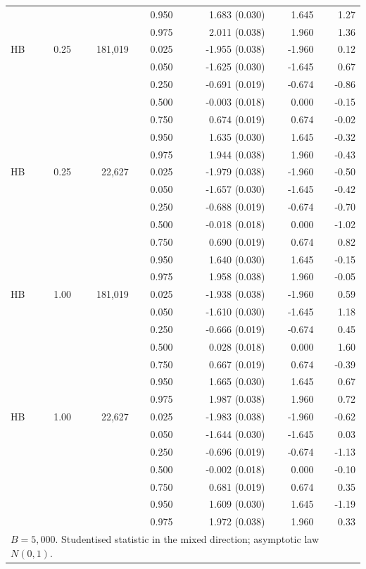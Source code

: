\begin{tabular}{lrrrrrr}
 &  &  & 0.950 & 1.683 (0.030) & 1.645 & 1.27 \\
 &  &  & 0.975 & 2.011 (0.038) & 1.960 & 1.36 \\
\addlinespace
HB & 0.25 & 181,019 & 0.025 & -1.955 (0.038) & -1.960 & 0.12 \\
 &  &  & 0.050 & -1.625 (0.030) & -1.645 & 0.67 \\
 &  &  & 0.250 & -0.691 (0.019) & -0.674 & -0.86 \\
 &  &  & 0.500 & -0.003 (0.018) & 0.000 & -0.15 \\
 &  &  & 0.750 & 0.674 (0.019) & 0.674 & -0.02 \\
 &  &  & 0.950 & 1.635 (0.030) & 1.645 & -0.32 \\
 &  &  & 0.975 & 1.944 (0.038) & 1.960 & -0.43 \\
\addlinespace
HB & 0.25 & 22,627 & 0.025 & -1.979 (0.038) & -1.960 & -0.50 \\
 &  &  & 0.050 & -1.657 (0.030) & -1.645 & -0.42 \\
 &  &  & 0.250 & -0.688 (0.019) & -0.674 & -0.70 \\
 &  &  & 0.500 & -0.018 (0.018) & 0.000 & -1.02 \\
 &  &  & 0.750 & 0.690 (0.019) & 0.674 & 0.82 \\
 &  &  & 0.950 & 1.640 (0.030) & 1.645 & -0.15 \\
 &  &  & 0.975 & 1.958 (0.038) & 1.960 & -0.05 \\
\addlinespace
HB & 1.00 & 181,019 & 0.025 & -1.938 (0.038) & -1.960 & 0.59 \\
 &  &  & 0.050 & -1.610 (0.030) & -1.645 & 1.18 \\
 &  &  & 0.250 & -0.666 (0.019) & -0.674 & 0.45 \\
 &  &  & 0.500 & 0.028 (0.018) & 0.000 & 1.60 \\
 &  &  & 0.750 & 0.667 (0.019) & 0.674 & -0.39 \\
 &  &  & 0.950 & 1.665 (0.030) & 1.645 & 0.67 \\
 &  &  & 0.975 & 1.987 (0.038) & 1.960 & 0.72 \\
\addlinespace
HB & 1.00 & 22,627 & 0.025 & -1.983 (0.038) & -1.960 & -0.62 \\
 &  &  & 0.050 & -1.644 (0.030) & -1.645 & 0.03 \\
 &  &  & 0.250 & -0.696 (0.019) & -0.674 & -1.13 \\
 &  &  & 0.500 & -0.002 (0.018) & 0.000 & -0.10 \\
 &  &  & 0.750 & 0.681 (0.019) & 0.674 & 0.35 \\
 &  &  & 0.950 & 1.609 (0.030) & 1.645 & -1.19 \\
 &  &  & 0.975 & 1.972 (0.038) & 1.960 & 0.33 \\
\midrule
\multicolumn{7}{l}{$B=5,000$. Studentised statistic in the mixed direction; asymptotic law $N(0,1)$.} \\
\bottomrule
\end{tabular}
